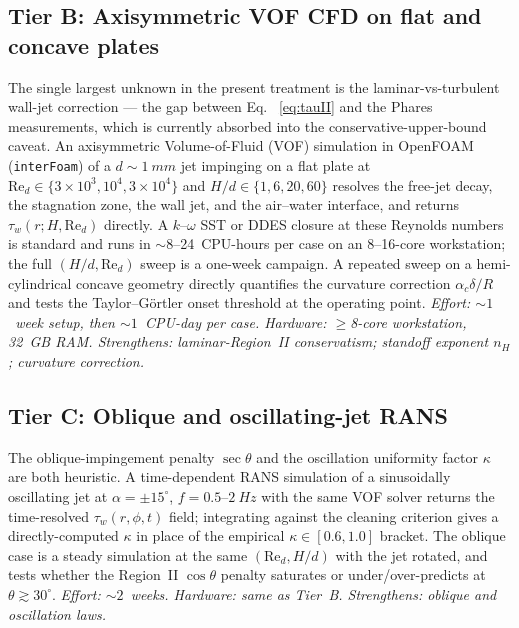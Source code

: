 \documentclass[aps,prfluids,reprint,amsmath,amssymb,floatfix]{revtex4-2}
\newcommand{\Rey}{\mathrm{Re}}
\begin{document}
\subsection*{Tier B: Axisymmetric VOF CFD on flat and concave plates}
The single largest unknown in the present treatment is the
laminar-vs-turbulent wall-jet correction --- the gap between Eq.~%
\eqref{eq:tauII} and the Phares \citep{Phares2000} measurements,
which is currently absorbed into the conservative-upper-bound
caveat. An axisymmetric Volume-of-Fluid (VOF) simulation in OpenFOAM
(\texttt{interFoam}) of a $d \sim \SI{1}{mm}$ jet impinging on a
flat plate at $\Rey_d \in \{3\times 10^3, 10^4, 3\times 10^4\}$ and
$H/d \in \{1, 6, 20, 60\}$ resolves the free-jet decay, the
stagnation zone, the wall jet, and the air--water interface, and
returns $\tau_w(r;H,\Rey_d)$ directly. A $k$--$\omega$ SST or DDES
closure at these Reynolds numbers is standard and runs in
$\sim$8--24~CPU-hours per case on an 8--16-core workstation; the
full $(H/d, \Rey_d)$ sweep is a one-week campaign. A repeated sweep
on a hemi-cylindrical concave geometry directly quantifies the
curvature correction $\alpha_c \delta/R$ and tests the
Taylor--G\"ortler onset threshold at the operating point.
\textit{Effort: $\sim 1$~week setup, then $\sim 1$~CPU-day per
case. Hardware: $\geq$8-core workstation, 32~GB RAM.
Strengthens: laminar-Region~II conservatism; standoff
exponent $n_H$; curvature correction.}

\subsection*{Tier C: Oblique and oscillating-jet RANS}
The oblique-impingement penalty $\sec\theta$ and the oscillation
uniformity factor $\kappa$ are both heuristic. A time-dependent
RANS simulation of a sinusoidally oscillating jet at $\alpha =
\pm 15^\circ$, $f = 0.5$--$\SI{2}{Hz}$ with the same VOF solver
returns the time-resolved $\tau_w(r,\phi,t)$ field; integrating
against the cleaning criterion gives a directly-computed $\kappa$
in place of the empirical $\kappa \in [0.6, 1.0]$ bracket. The
oblique case is a steady simulation at the same $(\Rey_d, H/d)$
with the jet rotated, and tests whether the Region~II $\cos\theta$
penalty saturates or under/over-predicts at $\theta \gtrsim 30^\circ$.
\textit{Effort: $\sim 2$~weeks. Hardware: same as Tier~B.
Strengthens: oblique and oscillation laws.}
\end{document}
